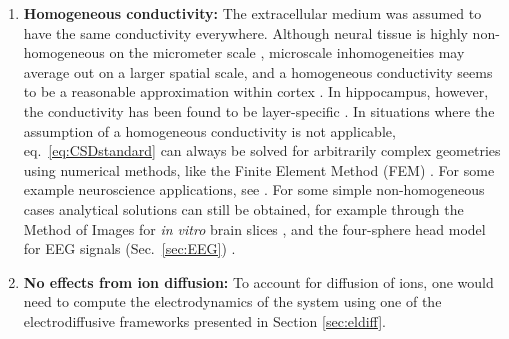 \documentclass[preprint,11pt,authoryear]{elsarticle}
\newcommand{\hlb}[2][blue]{ {\sethlcolor{#1} \hl{#2}} }
\newcommand{\hlj}[2][OliveGreen]{ {\sethlcolor{#1} \hl{#2}} }
\newcommand{\hlR}[2][red]{ {\sethlcolor{#1} \hl{#2}} }
\newcommand{\ghnote}[1]{\color{white}{\hlb{GH: #1 }}\color{black}}
\newcommand{\gen}[1]{\color{white}{\hlR{GTE: #1 }}\color{black}}
\newcommand{\tvnnote}[1]{\color{white}{\hlj{TVN: #1 }}\color{black}}
\begin{document}
\begin{enumerate}

\item {\bf Homogeneous  conductivity:} The extracellular medium was assumed to have the same conductivity everywhere. Although neural tissue is highly non-homogeneous on the micrometer scale \citep{Nicholson1998}, microscale inhomogeneities may average out on a larger spatial scale, and a homogeneous conductivity seems to be a reasonable approximation within cortex \citep{Logothetis2007}. In hippocampus, however, the conductivity has been found to be layer-specific \citep{lopez2001}. In situations where the assumption of a homogeneous conductivity is not applicable, eq.~\ref{eq:CSDstandard} can always be solved for arbitrarily complex geometries using numerical methods, like the Finite Element Method (FEM) \citep{Logg2012}. For some example neuroscience applications, see \cite{Moffitt2005, Frey2009, Joucla2012, Haufe2015, Ness2015, Buccino2019b, Obien2019}. For some simple non-homogeneous cases analytical solutions can still be obtained, for example through the Method of Images for {\it in vitro} brain slices \citep{Ness2015}, and the four-sphere head model for EEG signals (Sec.~\ref{sec:EEG}) \citep{Naess2017}.

\item {\bf No effects from ion diffusion:} To account for diffusion of ions, one would need to compute the electrodynamics of the system using one of the electrodiffusive frameworks presented in Section \ref{sec:eldiff}.

\end{enumerate}
\end{document}
